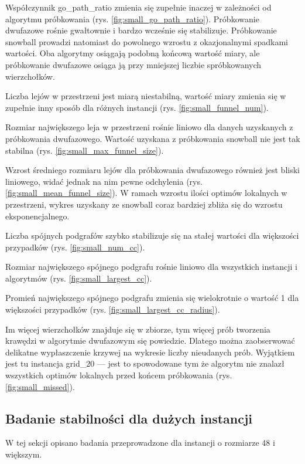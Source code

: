 Współczynnik go\_path\_ratio zmienia się zupełnie inaczej w zależności od algorytmu próbkowania (rys. \ref{fig:small_go_path_ratio}).
Próbkowanie dwufazowe rośnie gwałtownie i bardzo wcześnie się stabilizuje.
Próbkowanie snowball prowadzi natomiast do powolnego wzrostu z okazjonalnymi spadkami wartości.
Oba algorytmy osiągają podobną końcową wartość miary, ale próbkowanie dwufazowe osiąga ją przy mniejszej
liczbie spróbkowanych wierzchołków.

Liczba lejów w przestrzeni jest miarą niestabilną, wartość miary zmienia się w zupełnie inny sposób
dla różnych instancji (rys. \ref{fig:small_funnel_num}).

Rozmiar największego leja w przestrzeni rośnie liniowo dla danych uzyskanych z próbkowania
dwufazowego. Wartość uzyskana z próbkowania snowball nie jest tak stabilna (rys. \ref{fig:small_max_funnel_size}).

Wzrost średniego rozmiaru lejów dla próbkowania dwufazowego również jest bliski liniowego,
widać jednak na nim pewne odchylenia (rys. \ref{fig:small_mean_funnel_size}). W ramach wzrostu ilości optimów lokalnych w przestrzeni,
wykres uzyskany ze snowball coraz bardziej zbliża się do wzrostu eksponencjalnego.

Liczba spójnych podgrafów szybko stabilizuje się na stałej wartości dla większości przypadków (rys. \ref{fig:small_num_cc}).

Rozmiar największego spójnego podgrafu rośnie liniowo dla wszystkich instancji i algorytmów (rys. \ref{fig:small_largest_cc}).

Promień największego spójnego podgrafu zmienia się wielokrotnie o wartość 1 dla większości przypadków (rys. \ref{fig:small_largest_cc_radius}).

Im więcej wierzchołków znajduje się w zbiorze, tym więcej prób tworzenia krawędzi w algorytmie dwufazowym
się powiedzie. Dlatego można zaobserwować delikatne wypłaszczenie krzywej na wykresie liczby nieudanych prób.
Wyjątkiem jest tu instancja grid\_20  --- jest to spowodowane tym że algorytm nie znalazł wszystkich optimów
lokalnych przed końcem próbkowania (rys. \ref{fig:small_missed}).

\newpage

\subsection{Badanie stabilności dla dużych instancji}
W tej sekcji opisano badania przeprowadzone dla instancji o rozmiarze 48 i większym.

